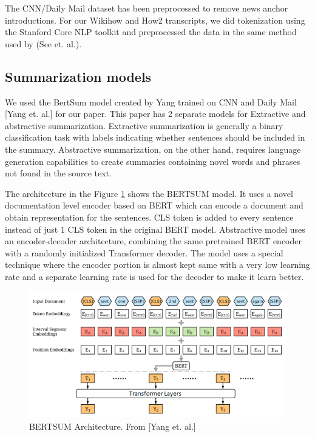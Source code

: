 \documentclass{article}
\begin{document}
The CNN/Daily Mail dataset has been preprocessed to remove news anchor introductions. For our Wikihow and How2 transcripts, we  did tokenization using the Stanford Core NLP toolkit and preprocessed the data in the same method used by (See et. al.).  


\subsection{Summarization models}

We used the BertSum model created by Yang trained on CNN and Daily Mail [Yang et. al.]  for our paper. This paper has 2 separate models for Extractive and abstractive summarization. Extractive summarization is generally a binary classification task with labels indicating whether sentences should be included in the summary. Abstractive summarization, on the other hand, requires language generation capabilities to create summaries containing novel words and phrases not found in the source text. 

The architecture in the Figure \ref{fig:architecure} shows the BERTSUM model. It uses a novel documentation level encoder based on BERT which can encode a document and obtain representation for the sentences. CLS token is added to every sentence instead of just 1 CLS token in the original BERT model. Abstractive model uses an encoder-decoder architecture, combining the same pretrained BERT encoder with a randomly initialized Transformer decoder. The model uses a special technique where the encoder portion is almost kept same with a very low learning rate and a separate learning rate is used for the decoder to make it learn better. 

\begin{figure}[H]
  \centering
  \includegraphics[scale=0.5]{bertsumarchitecture.png}
  \caption{BERTSUM Architecture. From [Yang et. al.]}
  \label{fig:architecure}
\end{figure}
\end{document}
